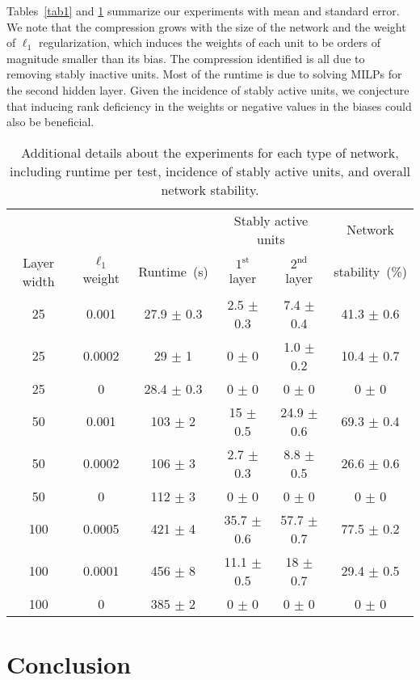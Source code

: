 \documentclass[runningheads]{llncs}
\begin{document}
Tables~\ref{tab1} and \ref{tab2} summarize our experiments with mean and standard error. We note that the compression grows with the size of the network and the weight of $\ell_1$ regularization, which induces the weights of each unit to be orders of magnitude smaller than its bias. The  compression identified is all due to removing stably inactive units. Most of the runtime is due to solving MILPs for the second hidden layer. Given the incidence of stably active units, we conjecture that inducing rank deficiency in the weights or negative values in the biases could also be beneficial. 

\begin{table}
\caption{Additional details about the experiments for each type of network, including runtime per test, incidence of stably active units, and overall network stability.}
\label{tab2}
\centering
\begin{tabular}{@{\extracolsep{6pt}}cccccc}
&&& \multicolumn{2}{c}{Stably active units} &  Network \\
\cline{4-5}
Layer width & $\ell_1$ weight & Runtime~(s) &  $1^{\text{st}}$ layer & $2^{\text{nd}}$ layer &  stability~(\%) \\
\hline
25 & 0.001 & 27.9 $\pm$ 0.3 & 2.5 $\pm$ 0.3 & 7.4 $\pm$ 0.4 & 41.3 $\pm$ 0.6 \\ 
25 & 0.0002 & 29 $\pm$ 1 & 0 $\pm$ 0 & 1.0 $\pm$ 0.2 & 10.4 $\pm$ 0.7 \\ 
25 & 0 & 28.4 $\pm$ 0.3 & 0 $\pm$ 0 & 0 $\pm$ 0 & 0 $\pm$ 0 \\ 
\hline
50 & 0.001 & 103 $\pm$ 2 & 15 $\pm$ 0.5 & 24.9 $\pm$ 0.6 & 69.3 $\pm$ 0.4 \\ 
50 & 0.0002 & 106 $\pm$ 3 & 2.7 $\pm$ 0.3 & 8.8 $\pm$ 0.5 & 26.6 $\pm$ 0.6 \\ 
50 & 0 & 112 $\pm$ 3 & 0 $\pm$ 0 & 0 $\pm$ 0 & 0 $\pm$ 0 \\ 
\hline
100 & 0.0005 & 421 $\pm$ 4 & 35.7 $\pm$ 0.6 & 57.7 $\pm$ 0.7 & 77.5 $\pm$ 0.2 \\ 
100 & 0.0001 & 456 $\pm$ 8 & 11.1 $\pm$ 0.5 & 18 $\pm$ 0.7 & 29.4 $\pm$ 0.5 \\ 
100 & 0 & 385 $\pm$ 2 & 0 $\pm$ 0 & 0 $\pm$ 0 & 0 $\pm$ 0 \\ 
\end{tabular}
\end{table}

\section{Conclusion}\label{sec:conclusion}
\end{document}

